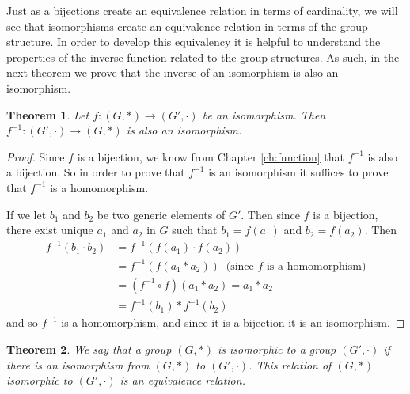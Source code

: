 \documentclass[
]{book}
\newtheorem{theorem}{Theorem}[chapter]
\theoremstyle{definition}
\theoremstyle{definition}
\theoremstyle{definition}
\theoremstyle{remark}
\begin{document}
Just as a bijections create an equivalence relation in terms of cardinality, we will see that isomorphisms create an equivalence relation in terms of the group structure. In order to develop this equivalency it is helpful to understand the properties of the inverse function related to the group structures. As such, in the next theorem we prove that the inverse of an isomorphism is also an isomorphism.

\begin{theorem}
\protect\hypertarget{thm:unnamed-chunk-164}{}{\label{thm:unnamed-chunk-164} }Let \(f:(G,*)\rightarrow (G',\cdot)\) be an isomorphism. Then \(f^{-1}:(G',\cdot)\rightarrow (G,*)\) is also an isomorphism.
\end{theorem}

\begin{proof}
{}Since \(f\) is a bijection, we know from Chapter \ref{ch:function} that \(f^{-1}\) is also a bijection. So in order to prove that \(f^{-1}\) is an isomorphism it suffices to prove that \(f^{-1}\) is a homomorphism.

If we let \(b_1\) and \(b_2\) be two generic elements of \(G'\). Then since \(f\) is a bijection, there exist unique \(a_1\) and \(a_2\) in \(G\) such that \(b_1=f(a_1)\) and \(b_2=f(a_2)\). Then
\begin{align*}
  f^{-1}(b_1 \cdot b_2) &= f^{-1}\left( f(a_1)\cdot f(a_2)\right) \\
  &= f^{-1} \left(f(a_1*a_2)\right) \: \mbox{ (since } f \mbox{ is a homomorphism)} \\
  &= (f^{-1}\circ f) (a_1*a_2) = a_1*a_2 \\
  &= f^{-1}(b_1)* f^{-1}(b_2) 
\end{align*}
and so \(f^{-1}\) is a homomorphism, and since it is a bijection it is an isomorphism.
\end{proof}

\begin{theorem}
\protect\hypertarget{thm:group-isomorphism-equivalence}{}{\label{thm:group-isomorphism-equivalence} }We say that a group \((G,*)\) is isomorphic to a group \((G',\cdot)\) if there is an isomorphism from \((G,*)\) to \((G',\cdot)\). This relation of \((G,*)\) isomorphic to \((G',\cdot)\) is an equivalence relation.
\end{theorem}
\end{document}

